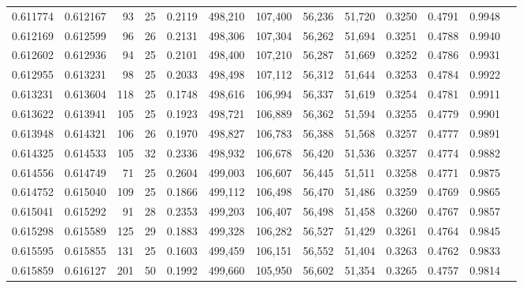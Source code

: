 \begin{tabular}{rrrrrrrrrrrrr}
0.611774 & 0.612167 &    93 &  25 &                                     0.2119 & 498,210 & 107,400 &  56,236 &  51,720 & 0.3250 & 0.4791 & 0.9948 \\
0.612169 & 0.612599 &    96 &  26 &                                     0.2131 & 498,306 & 107,304 &  56,262 &  51,694 & 0.3251 & 0.4788 & 0.9940 \\
0.612602 & 0.612936 &    94 &  25 &                                     0.2101 & 498,400 & 107,210 &  56,287 &  51,669 & 0.3252 & 0.4786 & 0.9931 \\
0.612955 & 0.613231 &    98 &  25 &                                     0.2033 & 498,498 & 107,112 &  56,312 &  51,644 & 0.3253 & 0.4784 & 0.9922 \\
0.613231 & 0.613604 &   118 &  25 &                                     0.1748 & 498,616 & 106,994 &  56,337 &  51,619 & 0.3254 & 0.4781 & 0.9911 \\
0.613622 & 0.613941 &   105 &  25 &                                     0.1923 & 498,721 & 106,889 &  56,362 &  51,594 & 0.3255 & 0.4779 & 0.9901 \\
0.613948 & 0.614321 &   106 &  26 &                                     0.1970 & 498,827 & 106,783 &  56,388 &  51,568 & 0.3257 & 0.4777 & 0.9891 \\
0.614325 & 0.614533 &   105 &  32 &                                     0.2336 & 498,932 & 106,678 &  56,420 &  51,536 & 0.3257 & 0.4774 & 0.9882 \\
0.614556 & 0.614749 &    71 &  25 &                                     0.2604 & 499,003 & 106,607 &  56,445 &  51,511 & 0.3258 & 0.4771 & 0.9875 \\
0.614752 & 0.615040 &   109 &  25 &                                     0.1866 & 499,112 & 106,498 &  56,470 &  51,486 & 0.3259 & 0.4769 & 0.9865 \\
0.615041 & 0.615292 &    91 &  28 &                                     0.2353 & 499,203 & 106,407 &  56,498 &  51,458 & 0.3260 & 0.4767 & 0.9857 \\
0.615298 & 0.615589 &   125 &  29 &                                     0.1883 & 499,328 & 106,282 &  56,527 &  51,429 & 0.3261 & 0.4764 & 0.9845 \\
0.615595 & 0.615855 &   131 &  25 &                                     0.1603 & 499,459 & 106,151 &  56,552 &  51,404 & 0.3263 & 0.4762 & 0.9833 \\
0.615859 & 0.616127 &   201 &  50 &                                     0.1992 & 499,660 & 105,950 &  56,602 &  51,354 & 0.3265 & 0.4757 & 0.9814 \\

\end{tabular}

